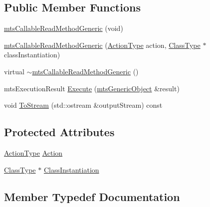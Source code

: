\subsection*{Public Member Functions}
\begin{DoxyCompactItemize}
\item 
\hyperlink{classmts_callable_read_method_generic_a7c144d5960ed81dca3fcb832f4f93075}{mts\+Callable\+Read\+Method\+Generic} (void)
\item 
\hyperlink{classmts_callable_read_method_generic_afb63b9256c99d419bf008fe8e90afc87}{mts\+Callable\+Read\+Method\+Generic} (\hyperlink{classmts_callable_read_method_generic_a0f8662a2b477512a0cfa147cc8faa555}{Action\+Type} action, \hyperlink{classmts_callable_read_method_generic_afa0ef401d0f5538af2f0fe114ad9202d}{Class\+Type} $\ast$class\+Instantiation)
\item 
virtual \hyperlink{classmts_callable_read_method_generic_a1fec0dfdfb8bb6ce918071d1d5011aaa}{$\sim$mts\+Callable\+Read\+Method\+Generic} ()
\item 
mts\+Execution\+Result \hyperlink{classmts_callable_read_method_generic_a2c37de960f723c477637f1d79e3ae7c5}{Execute} (\hyperlink{classmts_generic_object}{mts\+Generic\+Object} \&result)
\item 
void \hyperlink{classmts_callable_read_method_generic_af15dcc735815a28319e6aeaa7564785f}{To\+Stream} (std\+::ostream \&output\+Stream) const 
\end{DoxyCompactItemize}
\subsection*{Protected Attributes}
\begin{DoxyCompactItemize}
\item 
\hyperlink{classmts_callable_read_method_generic_a0f8662a2b477512a0cfa147cc8faa555}{Action\+Type} \hyperlink{classmts_callable_read_method_generic_a68e6410f6fc38a56009ac9c6bab0ac68}{Action}
\item 
\hyperlink{classmts_callable_read_method_generic_afa0ef401d0f5538af2f0fe114ad9202d}{Class\+Type} $\ast$ \hyperlink{classmts_callable_read_method_generic_a78aa69ee0ab2f0c1120a4320c1315507}{Class\+Instantiation}
\end{DoxyCompactItemize}


\subsection{Member Typedef Documentation}
\hypertarget{classmts_callable_read_method_generic_a0f8662a2b477512a0cfa147cc8faa555}{}
